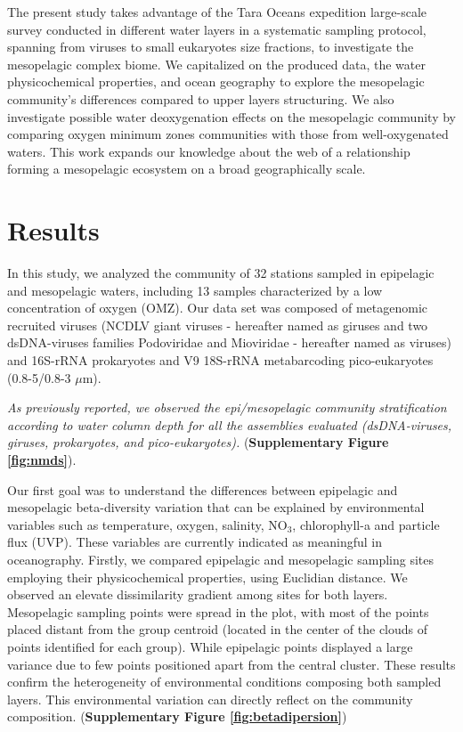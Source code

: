 \documentclass[fleqn,10pt]{wlscirep}
\begin{document}
The present study takes advantage of the Tara Oceans expedition large-scale survey conducted in different water layers in a systematic sampling protocol, spanning from viruses to small eukaryotes size fractions, to investigate the mesopelagic complex biome. We capitalized on the produced data, the water physicochemical properties, and ocean geography to explore the mesopelagic community's differences compared to upper layers structuring. We also investigate possible water deoxygenation effects on the mesopelagic community by comparing oxygen minimum zones communities with those from well-oxygenated waters. This work expands our knowledge about the web of a relationship forming a mesopelagic ecosystem on a broad geographically scale.

\section*{Results}

In this study, we analyzed the community of 32 stations sampled in epipelagic and mesopelagic waters, including 13 samples characterized by a low concentration of oxygen (OMZ). Our data set was composed of metagenomic recruited viruses (NCDLV giant viruses - hereafter named as giruses and two dsDNA-viruses families Podoviridae and Mioviridae - hereafter named as viruses) and 16S-rRNA prokaryotes and V9 18S-rRNA metabarcoding pico-eukaryotes (0.8-5/0.8-3 $\mu$m).

\textit{As previously reported, we observed the epi/mesopelagic community stratification according to water column depth for all the assemblies evaluated (dsDNA-viruses, giruses, prokaryotes, and pico-eukaryotes).}  (\textbf{Supplementary Figure \ref{fig:nmds}}). %

Our first goal was to understand the differences between epipelagic and mesopelagic beta-diversity variation that can be explained by environmental variables such as temperature, oxygen, salinity, NO$_3$, chlorophyll-a and particle flux (UVP). These variables are currently indicated as meaningful in oceanography. Firstly, we compared epipelagic and mesopelagic sampling sites employing their physicochemical properties, using Euclidian distance. We observed an elevate dissimilarity gradient among sites for both layers. Mesopelagic sampling points were spread in the plot, with most of the points placed distant from the group centroid (located in the center of the clouds of points identified for each group). While epipelagic points displayed a large variance due to few points positioned apart from the central cluster. %
These results confirm the heterogeneity of environmental conditions composing both sampled layers. This environmental variation can directly reflect on the community composition.  (\textbf{Supplementary Figure \ref{fig:betadipersion}})
\end{document}
